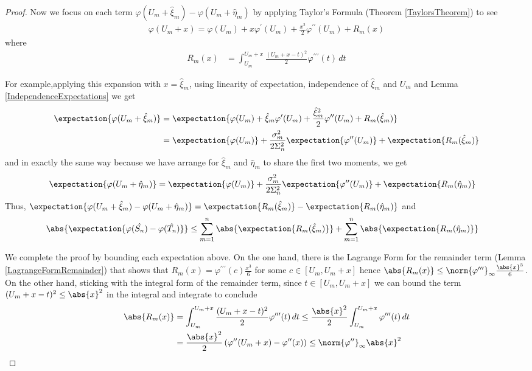 \begin{proof}
Now we focus on each term $\varphi(U_m + \hat{\xi}_m) -\varphi(U_m +
\hat{\eta}_m)$ by applying Taylor's Formula (Theorem
\ref{TaylorsTheorem}) to see 
\begin{align*}
\varphi(U_m + x) = \varphi(U_m) + x \varphi^\prime(U_m) +
\frac{x^2}{2} \varphi^{\prime\prime}(U_m) + R_m(x)
\end{align*}
where
\begin{align*}
R_m(x) &=  \int_{U_m}^{U_m+x}
\frac{(U_m + x - t)^2}{2} \varphi^{\prime \prime \prime}(t) \, dt
\end{align*}

For example,applying this expansion with $x = \hat{\xi}_m$, using
linearity of expectation, independence of
$\hat{\xi}_m$ and $U_m$ and Lemma \ref{IndependenceExpectations} we get
\begin{align*}
\expectation{\varphi(U_m + \hat{\xi}_m) } &= \expectation{
  \varphi(U_m)+ \hat{\xi}_m \varphi^\prime(U_m) +
\frac{\hat{\xi}_m^2}{2} \varphi^{\prime\prime}(U_m) +
R_m(\hat{\xi}_m)} \\
&=\expectation{
  \varphi(U_m)} + \frac{\sigma_m^2}{2\Sigma_n^2}\expectation{\varphi^{\prime\prime}(U_m)} + \expectation{R_m(\hat{\xi}_m)}
\end{align*}
and in exactly the same way because we have arrange for $\hat{\xi}_m$
and $\hat{\eta}_m$ to share the first two moments, we get
\begin{align*}
\expectation{\varphi(U_m + \hat{\eta}_m) } &=\expectation{
  \varphi(U_m)} + \frac{\sigma_m^2}{2\Sigma_n^2}\expectation{\varphi^{\prime\prime}(U_m)} + \expectation{R_m(\hat{\eta}_m)}
\end{align*}
Thus, $\expectation{\varphi(U_m + \hat{\xi}_m)
  -\varphi(U_m + \hat{\eta}_m)} = \expectation{R_m(\hat{\xi}_m)} -
\expectation{R_m(\hat{\eta}_m)}$ and 
\begin{align*}
\abs{\expectation{\varphi(\hat{S_n}) - \varphi(\hat{T_n})}} &\leq 
\sum_{m=1}^n \abs{\expectation{R_m(\hat{\xi}_m) }} +  \sum_{m=1}^n \abs{\expectation{R_m(\hat{\eta}_m) }}
\end{align*}

We complete the proof by bounding each expectation above.  On the one hand, there is the Lagrange Form for the
remainder term (Lemma \ref{LagrangeFormRemainder}) that shows that $R_m(x) =
\varphi^{\prime\prime\prime}(c) \frac{x^3}{6}$ for some $c \in [U_m,
U_m+x]$ hence $\abs{R_m(x)} \leq
\norm{\varphi^{\prime\prime\prime}}_\infty \frac{\abs{x}^3}{6}$. On
the other hand, sticking with the integral form of the remainder term, since $t \in [U_m, U_m + x]$ we can bound the term $(U_m + x - t)^2 \leq \abs{x}^2$ in
the integral and integrate to conclude 
\begin{align*}
\abs{R_m(x)} &=  \int_{U_m}^{U_m+x}
\frac{(U_m + x - t)^2}{2} \varphi^{\prime \prime \prime}(t) \, dt \leq
\frac{\abs{x}^2}{2} \int_{U_m}^{U_m+x}
\varphi^{\prime \prime \prime}(t) \, dt \\
&=\frac{\abs{x}^2}{2} \left(\varphi^{\prime \prime}(U_m+x) - \varphi^{\prime \prime}(x)\right) \leq \norm{\varphi^{\prime\prime}}_\infty \abs{x}^2
\end{align*}


\end{proof}
